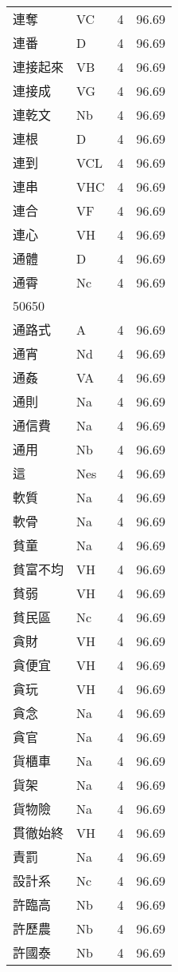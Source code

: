 \documentclass[twocolumn]{book}
\begin{document}
\begin{supertabular}{llrr}
連奪 & VC & 4 &  96.69\\
連番 & D & 4 &  96.69\\
連接起來 & VB & 4 &  96.69\\
連接成 & VG & 4 &  96.69\\
連乾文 & Nb & 4 &  96.69\\
連根 & D & 4 &  96.69\\
連到 & VCL & 4 &  96.69\\
連串 & VHC & 4 &  96.69\\
連合 & VF & 4 &  96.69\\
連心 & VH & 4 &  96.69\\
通體 & D & 4 &  96.69\\
通霄 & Nc & 4 &  96.69\\
50650\\
通路式 & A & 4 &  96.69\\
通宵 & Nd & 4 &  96.69\\
通姦 & VA & 4 &  96.69\\
通則 & Na & 4 &  96.69\\
通信費 & Na & 4 &  96.69\\
通用 & Nb & 4 &  96.69\\
這 & Nes & 4 &  96.69\\
軟質 & Na & 4 &  96.69\\
軟骨 & Na & 4 &  96.69\\
貧童 & Na & 4 &  96.69\\
貧富不均 & VH & 4 &  96.69\\
貧弱 & VH & 4 &  96.69\\
貧民區 & Nc & 4 &  96.69\\
貪財 & VH & 4 &  96.69\\
貪便宜 & VH & 4 &  96.69\\
貪玩 & VH & 4 &  96.69\\
貪念 & Na & 4 &  96.69\\
貪官 & Na & 4 &  96.69\\
貨櫃車 & Na & 4 &  96.69\\
貨架 & Na & 4 &  96.69\\
貨物險 & Na & 4 &  96.69\\
貫徹始終 & VH & 4 &  96.69\\
責罰 & Na & 4 &  96.69\\
設計系 & Nc & 4 &  96.69\\
許臨高 & Nb & 4 &  96.69\\
許歷農 & Nb & 4 &  96.69\\
許國泰 & Nb & 4 &  96.69\\

\end{supertabular}
\end{document}
